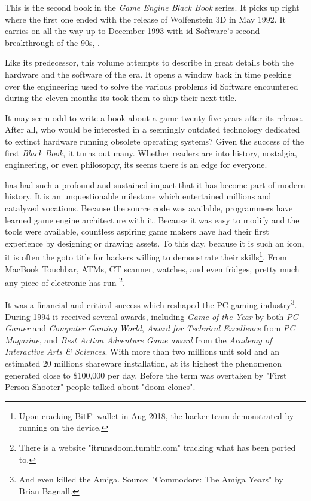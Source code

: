 This is the second book in the \textit{Game Engine Black Book} series. It picks up right where the first one ended with the release of Wolfenstein 3D in May 1992. It carries on all the way up to December 1993 with id Software's second breakthrough of the 90s, \doom{}.\\ %
\par
 Like its predecessor, this volume attempts to describe in great details both the hardware and the software of the era. It opens a window back in time peeking over the engineering used to solve the various problems id Software encountered during the eleven months its took them to ship their next title.\\%
\par
It may seem odd to write a book about a game twenty-five years after its release. After all, who would be interested in a seemingly outdated technology dedicated to extinct hardware running obsolete operating systems? Given the success of the first \textit{Black Book}, it turns out many. Whether readers are into history, nostalgia, engineering, or even philosophy, its seems there is an edge for everyone.\\ 

\par
\doom{} has had such a profound and sustained impact that it has become part of modern history. It is an unquestionable milestone which entertained millions and catalyzed vocations. Because the source code was available, programmers have learned game engine architecture with it. Because it was easy to modify and the tools were available, countless aspiring game makers have had their first experience by designing or drawing assets. To this day, because it is such an icon, it is often the goto title for hackers willing to demonstrate their skills\footnote{Upon cracking BitFi wallet in Aug 2018, the hacker team demonstrated by running \doom{} on the device.}. From MacBook Touchbar, ATMs, CT scanner, watches, and even fridges, pretty much any piece of electronic has run \doom{} \footnote{There is a website "itrunsdoom{}.tumblr.com" tracking what \doom{} has been ported to.}.\\
\par

It was a financial and critical success which reshaped the PC gaming industry\footnote{And even killed the Amiga. Source: "Commodore: The Amiga Years" by Brian Bagnall.}. During 1994 it received several awards, including \textit{Game of the Year} by both \textit{PC Gamer} and \textit{Computer Gaming World}, \textit{Award for Technical Excellence} from \textit{PC Magazine}, and \textit{Best Action Adventure Game award} from the \textit{Academy of Interactive Arts \& Sciences}. With more than two millions unit sold and an estimated 20 millions shareware installation, at its highest the phenomenon generated close to \$100,000 per day. Before the term was overtaken by "First Person Shooter" people talked about "doom clones".\\
\par

